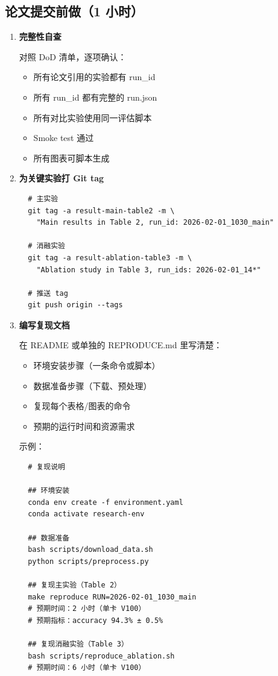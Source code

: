 \subsection{论文提交前做（1 小时）}

\begin{enumerate}
  \item \textbf{完整性自查}

  对照 DoD 清单，逐项确认：
  \begin{itemize}
    \item[$\square$] 所有论文引用的实验都有 run\_id
    \item[$\square$] 所有 run\_id 都有完整的 run.json
    \item[$\square$] 所有对比实验使用同一评估脚本
    \item[$\square$] Smoke test 通过
    \item[$\square$] 所有图表可脚本生成
  \end{itemize}

  \item \textbf{为关键实验打 Git tag}
  \begin{verbatim}
  # 主实验
  git tag -a result-main-table2 -m \
    "Main results in Table 2, run_id: 2026-02-01_1030_main"

  # 消融实验
  git tag -a result-ablation-table3 -m \
    "Ablation study in Table 3, run_ids: 2026-02-01_14*"

  # 推送 tag
  git push origin --tags
  \end{verbatim}

  \item \textbf{编写复现文档}

  在 README 或单独的 REPRODUCE.md 里写清楚：
  \begin{itemize}
    \item 环境安装步骤（一条命令或脚本）
    \item 数据准备步骤（下载、预处理）
    \item 复现每个表格/图表的命令
    \item 预期的运行时间和资源需求
  \end{itemize}

  示例：
  \begin{verbatim}
  # 复现说明

  ## 环境安装
  conda env create -f environment.yaml
  conda activate research-env

  ## 数据准备
  bash scripts/download_data.sh
  python scripts/preprocess.py

  ## 复现主实验（Table 2）
  make reproduce RUN=2026-02-01_1030_main
  # 预期时间：2 小时（单卡 V100）
  # 预期指标：accuracy 94.3% ± 0.5%

  ## 复现消融实验（Table 3）
  bash scripts/reproduce_ablation.sh
  # 预期时间：6 小时（单卡 V100）
  \end{verbatim}
\end{enumerate}

